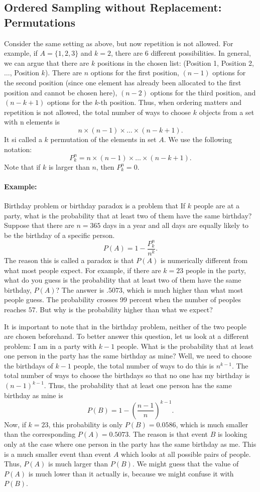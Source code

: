 \subsection{Ordered Sampling without Replacement: Permutations}
Consider the same setting as above, but now repetition is not allowed. For example, if $A=\{1,2,3\}$ and $k=2$, there are 6 different possibilities. In general, we can argue that there are $k$ positions in the chosen list: (Position 1, Position 2, $\dots$, Position $k$). There are $n$ options for the first position, $(n−1)$ options for the second position (since one element has already been allocated to the first position and cannot be chosen here), $(n−2)$ options for the third position, and $(n−k+1)$ options for the $k$-th position. Thus, when ordering matters and repetition is not allowed, the total number of ways to choose $k$ objects from a set with n elements is 
$$n\times (n-1)\times \dots \times (n-k+1).$$
It si called a $k$ permutation of the elements in set $A$. We use the following notation:
$$P_k^n = n\times (n-1)\times \dots \times (n-k+1).$$
Note that if $k$ is larger than $n$, then $P_k^n =0$. 
\paragraph{Example:} Birthday problem or birthday paradox is a problem that If $k$ people are at a party, what is the probability that at least two of them have the same birthday? Suppose that there are $n=365$ days in a year and all days are equally likely to be the birthday of a specific person.
$$P(A) = 1-\frac{P_k^n}{n^k}.$$
The reason this is called a paradox is that $P(A)$ is numerically different from what most people expect. For example, if there are $k=23$ people in the party, what do you guess is the probability that at least two of them have the same birthday, $P(A)$? The answer is $.5073$, which is much higher than what most people guess. The probability crosses 99 percent when the number of peoples reaches $57$. But why is the probability higher than what we expect?

It is important to note that in the birthday problem, neither of the two people are chosen beforehand. To better answer this question, let us look at a different problem: I am in a party with $k−1$ people. What is the probability that at least one person in the party has the same birthday as mine? Well, we need to choose the birthdays of $k−1$ people, the total number of ways to do this is $n^{k-1}$. The total number of ways to choose the birthdays so that no one has my birthday is $(n-1)^{k-1}$. Thus, the probability that at least one person has the same birthday as mine is 
$$P(B) = 1-\left(\frac{n-1}{n}\right)^{k-1}.$$
Now, if $k=23$, this probability is only $P(B)=0.0586$, which is much smaller than the corresponding $P(A)=0.5073$. The reason is that event $B$ is looking only at the case where one person in the party has the same birthday as me. This is a much smaller event than event $A$ which looks at all possible pairs of people. Thus, $P(A)$ is much larger than $P(B)$. We might guess that the value of $P(A)$ is much lower than it actually is, because we might confuse it with $P(B)$.

